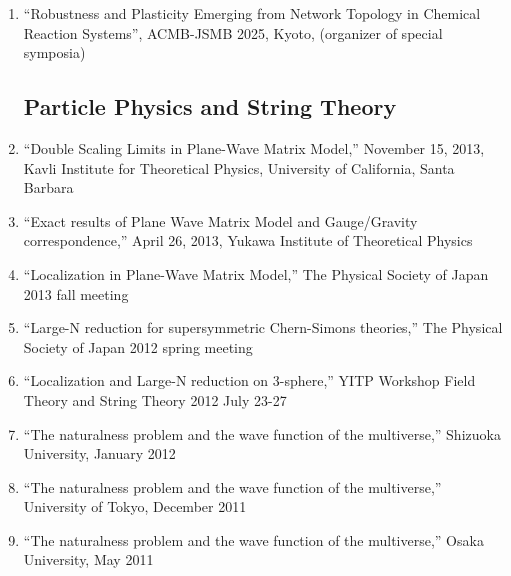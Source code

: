 \documentclass[letterpaper,12pt]{article}
\def\footerlink{}
\begin{document}
\begin{enumerate}
\item ``Robustness and Plasticity Emerging from Network Topology in Chemical Reaction Systems'', ACMB-JSMB 2025, Kyoto, (organizer of special symposia)
\subsection*{Particle Physics and String Theory}

\item ``Double Scaling Limits in Plane-Wave Matrix Model,'' November 15, 2013, Kavli Institute for Theoretical Physics, University of California, Santa Barbara
\item ``Exact results of Plane Wave Matrix Model and Gauge/Gravity correspondence,'' April 26, 2013, Yukawa Institute of Theoretical Physics
 \item ``Localization in Plane-Wave Matrix Model,'' The Physical Society of Japan 2013 fall meeting
\item ``Large-N reduction for supersymmetric Chern-Simons theories,'' The Physical Society of Japan 2012 spring meeting
 \item ``Localization and Large-N reduction on 3-sphere,'' YITP Workshop Field Theory and String Theory 2012 July 23-27
 \item ``The naturalness problem and the wave function of the multiverse,'' Shizuoka University, January 2012
\item ``The naturalness problem and the wave function of the multiverse,'' University of Tokyo, December 2011
 \item ``The naturalness problem and the wave function of the multiverse,'' Osaka University, May 2011


\end{enumerate}

\end{document}
